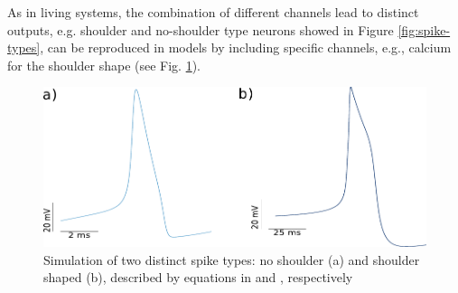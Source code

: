 %
%
%


As in living systems, the combination of different channels lead to distinct outputs, e.g. shoulder and no-shoulder type neurons showed in Figure \ref{fig:spike-types}, can be reproduced in models by including specific channels, e.g., calcium for the shoulder shape (see Fig. \ref{fig:spike-types model}). 

\begin{figure}[htb!]
	\includegraphics[width=\textwidth]{img/intro/spike-types model.pdf}
	\caption{Simulation of two distinct spike types: no shoulder (a) and shoulder shaped (b), described by equations in \cite{hodgkin_quantitative_1952} and \cite{vavoulis_balanced_2010}, respectively}
	\label{fig:spike-types model}
\end{figure}


